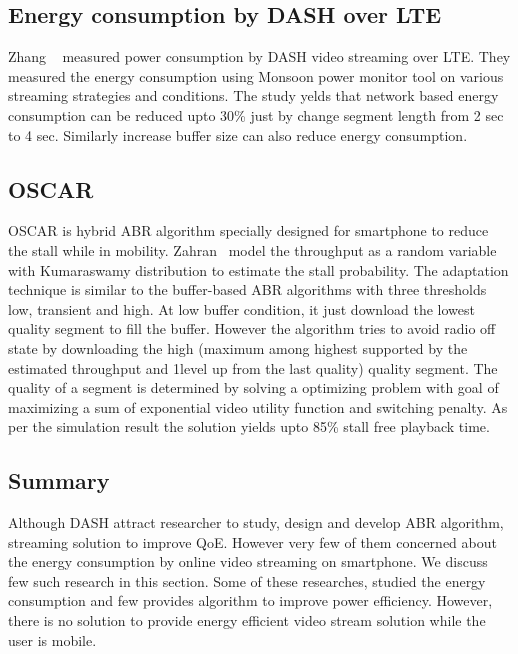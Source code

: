 \subsection{Energy consumption by DASH over LTE}
Zhang \etal\ \cite{10.1145/2910018.2910656} measured power consumption by DASH video streaming over LTE. They measured the energy consumption using Monsoon power monitor \cite{monsoonmonitor} tool on various streaming strategies and conditions. The study yelds that network based energy consumption can be reduced upto 30\% just by change segment length from 2 sec to 4 sec. Similarly increase buffer size can also reduce energy consumption.

\subsection{OSCAR}
OSCAR\cite{10.1145/2910018.2910655} is hybrid ABR algorithm specially designed for smartphone to reduce the stall while in mobility. Zahran \etal\ model the throughput as a random variable with Kumaraswamy distribution \cite{jones2009kumaraswamy} to estimate the stall probability. The adaptation technique is similar to the buffer-based ABR algorithms with three thresholds low, transient and high. At low buffer condition, it just download the lowest quality segment to fill the buffer. However the algorithm tries to avoid radio off state by downloading the high (maximum among highest supported by the estimated throughput and 1level up from the last quality) quality segment. The quality of a segment is determined by solving a optimizing problem with goal of maximizing a sum of exponential video utility function and switching penalty. As per the simulation result the solution yields upto 85\% stall free playback time.

\subsection{Summary}
Although DASH attract researcher to study, design and develop ABR algorithm, streaming solution to improve QoE. However very few of them concerned about the energy consumption by online video streaming on smartphone. We discuss few such research in this section. Some of these researches, studied the energy consumption\cite{10.1145/2910018.2910656} and few provides algorithm to improve power efficiency\cite{10.1145/2910018.2910655}. However, there is no solution to provide energy efficient video stream solution while the user is mobile.